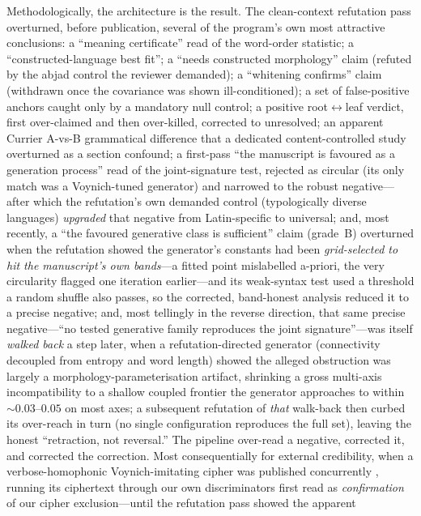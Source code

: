 \documentclass[11pt]{article}
\begin{document}
Methodologically, the architecture is the result. The clean-context refutation pass
overturned, before publication, several of the program's own most attractive
conclusions: a ``meaning certificate'' read of the word-order statistic; a
``constructed-language best fit''; a ``needs constructed morphology'' claim (refuted by
the abjad control the reviewer demanded); a ``whitening confirms'' claim (withdrawn
once the covariance was shown ill-conditioned); a set of false-positive anchors caught
only by a mandatory null control; a positive root$\leftrightarrow$leaf verdict, first
over-claimed and then over-killed, corrected to unresolved; an apparent Currier
A-vs-B grammatical difference that a dedicated content-controlled study overturned as a
section confound; a first-pass ``the manuscript is favoured as a
generation process'' read of the joint-signature test, rejected as circular (its only
match was a Voynich-tuned generator) and narrowed to the robust negative---after which
the refutation's own demanded control (typologically diverse languages) \emph{upgraded}
that negative from Latin-specific to universal; and, most recently, a ``the favoured
generative class is sufficient'' claim (grade~B) overturned when the refutation showed the
generator's constants had been \emph{grid-selected to hit the manuscript's own bands}---a
fitted point mislabelled a-priori, the very circularity flagged one iteration earlier---and
its weak-syntax test used a threshold a random shuffle also passes, so the corrected,
band-honest analysis reduced it to a precise negative; and, most tellingly in the reverse
direction, that same precise negative---``no tested generative family reproduces the joint
signature''---was itself \emph{walked back} a step later, when a refutation-directed
generator (connectivity decoupled from entropy and word length) showed the alleged
obstruction was largely a morphology-parameterisation artifact, shrinking a gross
multi-axis incompatibility to a shallow coupled frontier the generator approaches to within
$\sim\!0.03$--$0.05$ on most axes; a subsequent refutation of \emph{that} walk-back then
curbed its over-reach in turn (no single configuration reproduces the full set), leaving the
honest ``retraction, not reversal.'' The pipeline over-read a negative, corrected it, and
corrected the correction. Most consequentially for external credibility, when a
verbose-homophonic Voynich-imitating cipher was published concurrently
\citep{greshko2025naibbe}, running its ciphertext through our own discriminators first read
as \emph{confirmation} of our cipher exclusion---until the refutation pass showed the apparent
\end{document}
